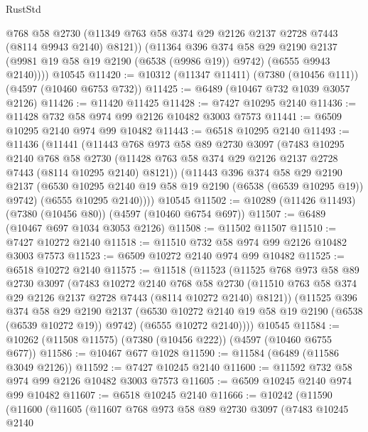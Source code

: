 \begin{lexlean}{RustStd}
\begin{coremodule}
          @768
          @58
          @2730
          (@11349 @763 @58 @374 @29 @2126 @2137 @2728 @7443 (@8114 @9943 @2140) @8121))
        (@11364
          @396
          @374
          @58
          @29
          @2190
          @2137
          (@9981 @19 @58 @19 @2190 (@6538 (@9986 @19)) @9742)
          (@6555 @9943 @2140))))
    @10545
@11420 := @10312 (@11347 @11411) (@7380 (@10456 @111)) (@4597 (@10460 @6753 @732))
@11425 := @6489 (@10467 @732 @1039 @3057 @2126)
@11426 := @11420 @11425
@11428 := @7427 @10295 @2140
@11436 := @11428 @732 @58 @974 @99 @2126 @10482 @3003 @7573
@11441 := @6509 @10295 @2140 @974 @99 @10482
@11443 := @6518 @10295 @2140
@11493 := @11436
    (@11441
      (@11443
        @768
        @973
        @58
        @89
        @2730
        @3097
        (@7483
          @10295
          @2140
          @768
          @58
          @2730
          (@11428 @763 @58 @374 @29 @2126 @2137 @2728 @7443 (@8114 @10295 @2140) @8121))
        (@11443
          @396
          @374
          @58
          @29
          @2190
          @2137
          (@6530 @10295 @2140 @19 @58 @19 @2190 (@6538 (@6539 @10295 @19)) @9742)
          (@6555 @10295 @2140))))
    @10545
@11502 := @10289 (@11426 @11493) (@7380 (@10456 @80)) (@4597 (@10460 @6754 @697))
@11507 := @6489 (@10467 @697 @1034 @3053 @2126)
@11508 := @11502 @11507
@11510 := @7427 @10272 @2140
@11518 := @11510 @732 @58 @974 @99 @2126 @10482 @3003 @7573
@11523 := @6509 @10272 @2140 @974 @99 @10482
@11525 := @6518 @10272 @2140
@11575 := @11518
    (@11523
      (@11525
        @768
        @973
        @58
        @89
        @2730
        @3097
        (@7483
          @10272
          @2140
          @768
          @58
          @2730
          (@11510 @763 @58 @374 @29 @2126 @2137 @2728 @7443 (@8114 @10272 @2140) @8121))
        (@11525
          @396
          @374
          @58
          @29
          @2190
          @2137
          (@6530 @10272 @2140 @19 @58 @19 @2190 (@6538 (@6539 @10272 @19)) @9742)
          (@6555 @10272 @2140))))
    @10545
@11584 := @10262 (@11508 @11575) (@7380 (@10456 @222)) (@4597 (@10460 @6755 @677))
@11586 := @10467 @677 @1028
@11590 := @11584 (@6489 (@11586 @3049 @2126))
@11592 := @7427 @10245 @2140
@11600 := @11592 @732 @58 @974 @99 @2126 @10482 @3003 @7573
@11605 := @6509 @10245 @2140 @974 @99 @10482
@11607 := @6518 @10245 @2140
@11666 := @10242
    (@11590
      (@11600
        (@11605
          (@11607
            @768
            @973
            @58
            @89
            @2730
            @3097
            (@7483
              @10245
              @2140

\end{coremodule}
\end{lexlean}
